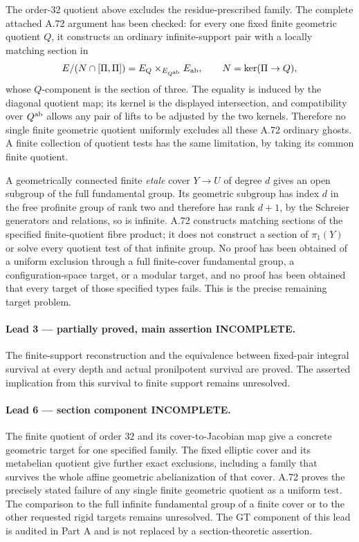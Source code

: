 The order-32 quotient above excludes the residue-prescribed
family. The complete attached A.72 argument has been checked:
for every one fixed finite geometric quotient \(Q\), it
constructs an ordinary infinite-support pair with a locally
matching section in
\[
 E/(N\cap[\Pi,\Pi])
       =E_Q\mathbin{\times}_{E_{Q^{\rm ab}}}E_{\rm ab},
       \qquad N=\ker(\Pi\to Q),
\]
whose \(Q\)-component is the section of three. The equality
is induced by the diagonal quotient map; its kernel is the
displayed intersection, and compatibility over \(Q^{\rm ab}\)
allows any pair of lifts to be adjusted by the two kernels.
Therefore no single finite geometric quotient uniformly
excludes all these A.72 ordinary ghosts. A finite collection
of quotient tests has the same limitation, by taking its
common finite quotient.

A geometrically connected finite \emph{etale} cover \(Y\to U\) of degree
\(d\) gives an open subgroup of the full fundamental group.
Its geometric subgroup has index \(d\) in the free profinite
group of rank two and therefore has rank \(d+1\), by the
Schreier generators and relations, so is infinite. A.72 constructs matching sections of the
specified finite-quotient fibre product; it does not construct
a section of \(\pi_1(Y)\) or solve every quotient test of
that infinite group. No proof has been obtained of a uniform
exclusion through a full finite-cover fundamental group, a
configuration-space target, or a modular target, and no
proof has been obtained that every target of those specified
types fails. This is the precise remaining target problem.

\paragraph{Lead 3 --- partially proved, main assertion INCOMPLETE.}
The finite-support reconstruction and the equivalence between
fixed-pair integral survival at every depth and actual
pronilpotent survival are proved. The asserted implication
from this survival to finite support remains unresolved.

\paragraph{Lead 6 --- section component INCOMPLETE.}
The finite quotient of order \(32\) and its cover-to-Jacobian
map give a concrete geometric target for one specified
family. The fixed elliptic cover and its metabelian quotient
give further exact exclusions, including a family that
survives the whole affine geometric abelianization of that
cover. A.72 proves the precisely stated failure of any
single finite geometric quotient as a uniform test. The
comparison to the full infinite fundamental group of a
finite cover or to the other requested rigid targets remains
unresolved. The GT component of this lead is audited in
Part A and is not replaced by a section-theoretic assertion.

